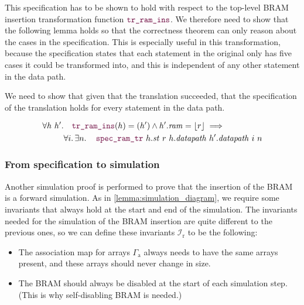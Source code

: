This specification has to be shown to hold with respect to the top-level BRAM
insertion transformation function $\yhfunction{tr\_ram\_ins}$.  We therefore
need to show that the following lemma holds so that the correctness theorem can
only reason about the cases in the specification.  This is especially useful in
this transformation, because the specification states that each statement in the
original \htl{} only has five cases it could be transformed into, and this is
independent of any other statement in the data path.

\begin{lemma}
  We need to show that given that the translation succeeded, that the
  specification of the translation holds for every statement in the data path.

  {\normalfont\begin{equation}
    \begin{aligned}
      \forall h\ h'\ldotp&\quad\yhfunction{tr\_ram\_ins}(h) = (h') \land
      h'.\mathit{ram} = \some{r} \implies\\
      &\forall i\ldotp \exists n\ldotp\quad\yhfunction{spec\_ram\_tr}\ h.\mathit{st}\ r\ h.\mathit{datapath}\ h'.\mathit{datapath}\ i\ n
    \end{aligned}
  \end{equation}}
\end{lemma}

\subsubsection{From specification to simulation}

Another simulation proof is performed to prove that the insertion of the
\gls{BRAM} is a forward simulation.  As in \cref{lemma:simulation_diagram}, we
require some invariants that always hold at the start and end of the simulation.
The invariants needed for the simulation of the \gls{BRAM} insertion are quite
different to the previous ones, so we can define these invariants
$\mathcal{I}_{\mathrm{r}}$ to be the following:

\begin{itemize}
\item The association map for arrays $\Gamma_{\mathrm{a}}$ always needs to have
  the same arrays present, and these arrays should never change in size.
\item The \gls{BRAM} should always be disabled at the start of each simulation
  step. (This is why self-disabling \gls{BRAM} is needed.)
\end{itemize}

